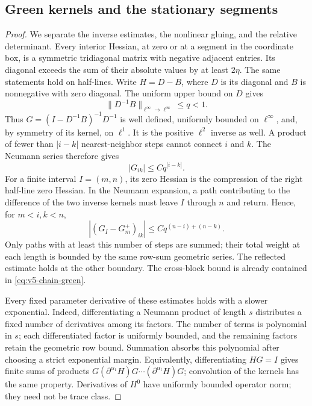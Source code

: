 \subsection{Green kernels and the stationary segments}
\begin{proof}
We separate the inverse estimates, the nonlinear gluing, and the
relative determinant. Every interior Hessian, at zero or at a segment
in the coordinate box, is a symmetric tridiagonal matrix with negative
adjacent entries. Its diagonal exceeds the sum of their absolute
values by at least $2\eta$. The same statements hold on half-lines.
Write $H=D-B$, where $D$ is its diagonal and $B$ is nonnegative with
zero diagonal. The uniform upper bound on $D$ gives
\[
 \|D^{-1}B\|_{\ell^\infty\to\ell^\infty}\le q<1.
\]
Thus $G=(I-D^{-1}B)^{-1}D^{-1}$ is well defined, uniformly bounded on
$\ell^\infty$, and, by symmetry of its kernel, on $\ell^1$. It is the
positive $\ell^2$ inverse as well. A product of fewer than $|i-k|$
nearest-neighbor steps cannot connect $i$ and $k$. The Neumann series
therefore gives
\begin{equation}\label{eq:v5-chain-green}
 |G_{ik}|\le Cq^{|i-k|}.
\end{equation}
For a finite interval $I=(m,n)$, its zero Hessian is the compression of
the right half-line zero Hessian. In the Neumann expansion, a path
contributing to the difference of the two inverse kernels must leave
$I$ through $n$ and return. Hence, for $m<i,k<n$,
\begin{equation}\label{eq:v5-green-comparison}
 |(G_I-G_m^+)_{ik}|\le Cq^{(n-i)+(n-k)}.
\end{equation}
Only paths with at least this number of steps are summed; their total
weight at each length is bounded by the same row-sum geometric series.
The reflected estimate holds at the other boundary. The cross-block
bound is already contained in \eqref{eq:v5-chain-green}.

Every fixed parameter derivative of these estimates holds with a
slower exponential. Indeed, differentiating a Neumann product of
length $s$ distributes a fixed number of derivatives among its factors.
The number of terms is polynomial in $s$; each differentiated factor is
uniformly bounded, and the remaining factors retain the geometric row
bound. Summation absorbs this polynomial after choosing a strict
exponential margin. Equivalently, differentiating $HG=I$ gives finite
sums of products $G(\partial^{\alpha_1}H)G\cdots
(\partial^{\alpha_t}H)G$; convolution of the kernels has the same
property. Derivatives of $H^0$ have uniformly bounded operator norm;
they need not be trace class.


\end{proof}

